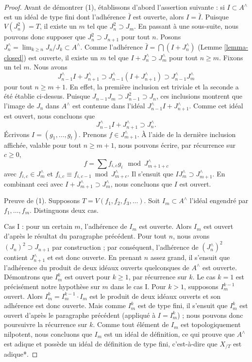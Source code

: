 \begin{proof}
\medskip\noindent
Avant de démontrer (1), établissons d'abord l'assertion suivante : si $I \subset A^\wedge$ est
un idéal de type fini dont l'adhérence $\bar I$ est ouverte, alors $I = \bar I$.
Puisque $V(J_n^2) = T$, il existe un $m$ tel que $J_n^2 \supset J_m$.
En passant à une sous-suite, nous pouvons donc supposer que $J_n^2 \supset J_{n + 1}$ pour tout
$n$. Posons $J_n^\wedge = \lim_{k \geq n} J_n/J_k \subset A^\wedge$.
Comme l'adhérence $\bar I = \bigcap (I + J_n^\wedge)$
(Lemme \ref{lemma-closed}) est ouverte, il existe un $m$ tel que
$I + J_n^\wedge \supset J_m^\wedge$ pour tout $n \geq m$. Fixons un tel $m$.
Nous avons
$$
J_{n - 1}^\wedge I + J_{n + 1}^\wedge \supset
J_{n - 1}^\wedge (I + J_{n + 1}^\wedge) \supset
J_{n - 1}^\wedge J_m^\wedge
$$
pour tout $n \geq m + 1$. En effet, la première inclusion est triviale et la
seconde a été établie ci-dessus. Puisque $J_{n - 1}J_m \supset J_{n - 1}^2 \supset J_n$,
ces inclusions montrent que l'image de $J_n$ dans $A^\wedge$
est contenue dans l'idéal $J_{n - 1}^\wedge I + J_{n + 1}^\wedge$.
Comme cet idéal est ouvert, nous concluons que
$$
J_{n - 1}^\wedge I + J_{n + 1}^\wedge \supset J_n^\wedge.
$$
Écrivons $I = (g_1, \ldots, g_t)$. Prenons $f \in J_{m + 1}^\wedge$.
À l'aide de la dernière inclusion affichée, valable pour tout $n \geq m + 1$,
nous pouvons écrire, par récurrence sur $c \geq 0$,
$$
f = \sum f_{i, c} g_i \mod J_{m + 1+ c}^\wedge
$$
avec $f_{i, c} \in J_m^\wedge$ et
$f_{i, c} \equiv f_{i, c - 1} \bmod J_{m + c}^\wedge$.
Il s'ensuit que $IJ_m^\wedge \supset J_{m + 1}^\wedge$.
En combinant ceci avec $I + J_{m + 1}^\wedge \supset J_m^\wedge$,
nous concluons que $I$ est ouvert.

\medskip\noindent
Preuve de (1). Supposons $T = V(f_1, f_2, f_3, \ldots)$.
Soit $I_m \subset A^\wedge$ l'idéal engendré par $f_1, \ldots, f_m$.
Distinguons deux cas.

\medskip\noindent
Cas I : pour un certain $m$, l'adhérence de $I_m$ est ouverte.
Alors $I_m$ est ouvert d'après le résultat du paragraphe précédent.
Pour tout $n$, nous avons $(J_n)^2 \supset J_{n+1}$ par construction ; par conséquent,
l'adhérence de $(J_n^\wedge)^2$ contient $J_{n+1}^\wedge$
et est donc ouverte. En prenant $n$ assez grand, il s'ensuit que l'adhérence
du produit de deux idéaux ouverts quelconques de $A^\wedge$ est ouverte.
Démontrons que $I_m^k$ est ouvert pour $k \ge 1$, par récurrence sur $k$.
Le cas $k = 1$ est précisément notre hypothèse sur $m$ dans le cas I.
Pour $k > 1$, supposons $I_m^{k - 1}$ ouvert. Alors
$I_m^k = I_m^{k - 1} \cdot I_m$ est le produit de deux idéaux ouverts
et son adhérence est donc ouverte. Mais comme $I_m^k$
est de type fini, il s'ensuit que $I_m^k$
est ouvert d'après le paragraphe précédent (appliqué à $I = I_m^k$) ;
nous pouvons donc poursuivre la récurrence sur $k$.
Comme tout élément de $I_m$ est topologiquement nilpotent, nous concluons
que $I_m$ est un idéal de définition, ce qui prouve que $A^\wedge$
est adique et possède un idéal de définition de type fini, c'est-à-dire que
$X_{/T}$ est adique*.


\end{proof}
